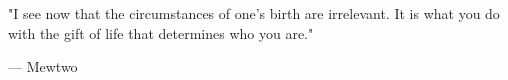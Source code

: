 \begin{dedica}  %

"I see now that the circumstances of one's birth are irrelevant. It is what you do with the gift of life that determines who you are."
\begin{flushright}
--- Mewtwo
\end{flushright}

\end{dedica}

